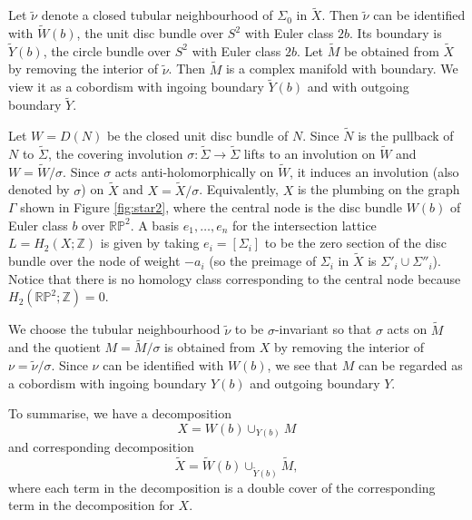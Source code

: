 \documentclass{amsart}
\theoremstyle{definition}
\theoremstyle{remark}
\numberwithin{equation}{section}
\begin{document}
Let $\widetilde{\nu}$ denote a closed tubular neighbourhood of $\Sigma_0$ in $\widetilde{X}$. Then $\widetilde{\nu}$ can be identified with $\widetilde{W}(b)$, the unit disc bundle over $S^2$ with Euler class $2b$. Its boundary is $\widetilde{Y}(b)$, the circle bundle over $S^2$ with Euler class $2b$. Let $\widetilde{M}$ be obtained from $\widetilde{X}$ by removing the interior of $\widetilde{\nu}$. Then $\widetilde{M}$ is a complex manifold with boundary. We view it as a cobordism with ingoing boundary $\widetilde{Y}(b)$ and with outgoing boundary $\widetilde{Y}$.

Let $W = D(N)$ be the closed unit disc bundle of $N$. Since $\widetilde{N}$ is the pullback of $N$ to $\widetilde{\Sigma}$, the covering involution $\sigma \colon \widetilde{\Sigma} \to \widetilde{\Sigma}$ lifts to an involution on $\widetilde{W}$ and $W = \widetilde{W}/\sigma$. Since $\sigma$ acts anti-holomorphically on $\widetilde{W}$, it induces an involution (also denoted by $\sigma$) on $\widetilde{X}$ and $X = \widetilde{X}/\sigma$. Equivalently, $X$ is the plumbing on the graph $\Gamma$ shown in Figure \ref{fig:star2}, where the central node is the disc bundle $W(b)$ of Euler class $b$ over $\mathbb{RP}^2$. A basis $e_1 , \dots , e_n$ for the intersection lattice $L = H_2(X  ; \mathbb{Z})$ is given by taking $e_i = [\Sigma_i]$ to be the zero section of the disc bundle over the node of weight $-a_i$ (so the preimage of $\Sigma_i$ in $\widetilde{X}$ is $\Sigma'_i \cup \Sigma''_i$). Notice that there is no homology class corresponding to the central node because $H_2(\mathbb{RP}^2 ; \mathbb{Z}) = 0$.

 

We choose the tubular neighbourhood $\widetilde{\nu}$ to be $\sigma$-invariant so that $\sigma$ acts on $\widetilde{M}$ and the quotient $M = \widetilde{M}/\sigma$ is obtained from $X$ by removing the interior of $\nu = \widetilde{\nu}/\sigma$. Since $\nu$ can be identified with $W(b)$, we see that $M$ can be regarded as a cobordism with ingoing boundary $Y(b)$ and outgoing boundary $Y$.

To summarise, we have a decomposition
\begin{equation}\label{equ:X}
X = W(b) \cup_{Y(b)} M
\end{equation}
and corresponding decomposition
\begin{equation}\label{equ:Xtilde}
\widetilde{X} = \widetilde{W}(b) \cup_{\widetilde{Y}(b)} \widetilde{M},
\end{equation}
where each term in the decomposition is a double cover of the corresponding term in the decomposition for $X$.
\end{document}
